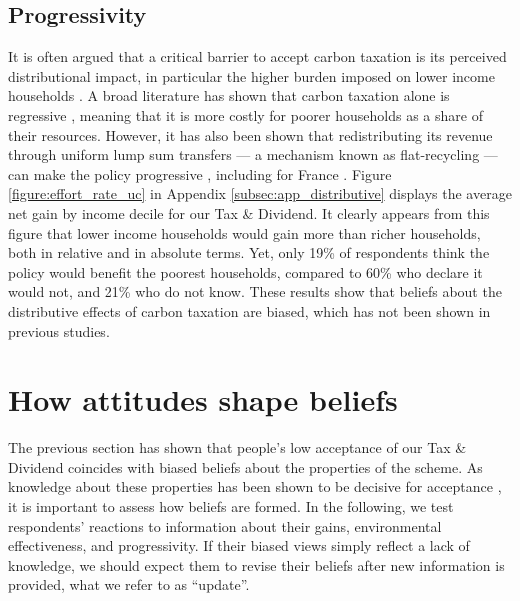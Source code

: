 \documentclass[12pt]{article} %
\begin{document}
    \subsection{Progressivity}
It is often argued that a critical barrier to accept carbon taxation is its perceived distributional impact, in particular the higher burden imposed on lower income households \citep{bristow_public_2010,brannlund_tax_2012,gevrek_public_2015}. A broad literature has shown that carbon taxation alone is regressive \citep{poterba_is_1991,metcalf_distributional_1999,grainger_who_2010}, meaning that it is more costly for poorer households as a share of their resources. However, it has also been shown that redistributing its revenue through uniform lump sum transfers --- a mechanism known as flat-recycling --- can make the policy progressive \citep{west_williams_04,bento_distributional_2009,williams_initial_2015}, including for France \citep{bureau_distributional_2011,douenne_2020}. Figure \ref{figure:effort_rate_uc} in Appendix \ref{subsec:app_distributive} displays the average net gain by income decile for our Tax \& Dividend. It clearly appears from this figure that lower income households would gain more than richer households, both in relative and in absolute terms. Yet, only 19\% of respondents think the policy would benefit the poorest households, compared to 60\% who declare it would not, and 21\% who do not know. These results show that beliefs about the distributive effects of carbon taxation are biased, which has not been shown in previous studies. 

\section{How attitudes shape beliefs \label{sec:persistence}}

The previous section has shown that people's low acceptance of our Tax \& Dividend coincides with biased beliefs about the properties of the scheme. As knowledge about these properties has been shown to be decisive for acceptance \citep{carattini_overcoming_2018}, it is important to assess how beliefs are formed. In the following, we test respondents' reactions to information about their gains, environmental effectiveness, and progressivity. If their biased views simply reflect a lack of knowledge, we should expect them to revise their beliefs after new information is provided, what we refer to as ``update''. %
\end{document}
